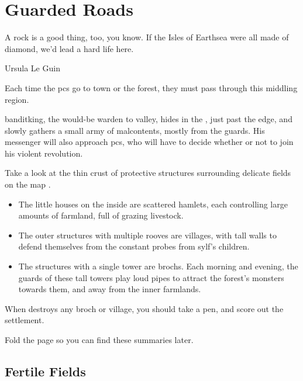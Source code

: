 \chapter{Guarded Roads}
\epigraph{A rock is a good thing, too, you know. If the Isles of Earthsea were all made of diamond, we'd lead a hard life here.}{Ursula Le Guin}
\label{roadsChapter}

\begin{multicols}{2}
\noindent
Each time the \glspl{pc} go to \gls{town} or the forest, they must pass through this middling \gls{region}.

\Gls{banditking}, the would-be \gls{warden} to \gls{valley}, hides in the , just past the \gls{edge}, and slowly gathers a small army of malcontents, mostly from the \glspl{guard}.
His messenger will also approach \glspl{pc}, who will have to decide whether or not to join his violent revolution.

Take a look at the thin crust of protective structures surrounding delicate fields on the map .

\begin{itemize}
  \item
  The little houses on the inside are scattered hamlets, each controlling large amounts of farmland, full of grazing livestock.
  \item
  The outer structures with multiple rooves are \glspl{village}, with tall walls to defend themselves from the constant probes from \gls{sylf}'s children.
  \item
  The structures with a single tower are \glspl{broch}.
  Each morning and evening, the \glspl{guard} of these tall towers play loud pipes to attract the forest's \glspl{monster} towards them, and away from the inner farmlands.
\end{itemize}

When  destroys any \gls{broch} or \gls{village}, you should take a pen, and score out the settlement.

\end{multicols}

\label{sqListRoads}

Fold the page so you can find these summaries later.

\section{Fertile Fields}

